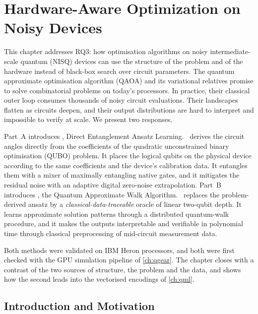 \chapter{Hardware-Aware Optimization on Noisy Devices}\label{ch:nisq}

This chapter addresses RQ3: how optimisation algorithms on noisy intermediate-scale quantum (NISQ) devices can use the structure of the problem and of the hardware instead of black-box search over circuit parameters. The quantum approximate optimisation algorithm (QAOA) and its variational relatives promise to solve combinatorial problems on today's processors. In practice, their classical outer loop consumes thousands of noisy circuit evaluations. Their landscapes flatten as circuits deepen, and their output distributions are hard to interpret and impossible to verify at scale. We present two responses.

Part~A introduces \deal, Direct Entanglement Ansatz Learning. \deal\ derives the circuit angles directly from the coefficients of the quadratic unconstrained binary optimisation (QUBO) problem. It places the logical qubits on the physical device according to the same coefficients and the device's calibration data. It entangles them with a mixer of maximally entangling native gates, and it mitigates the residual noise with an adaptive digital zero-noise extrapolation. Part~B introduces \qawa, the Quantum Approximate Walk Algorithm. \qawa\ replaces the problem-derived ansatz by a \emph{classical-data-traceable} oracle of linear two-qubit depth. It learns approximate solution patterns through a distributed quantum-walk procedure, and it makes the outputs interpretable and verifiable in polynomial time through classical preprocessing of mid-circuit measurement data.

Both methods were validated on IBM Heron processors, and both were first checked with the GPU simulation pipeline of \cref{ch:qgear}. The chapter closes with a contrast of the two sources of structure, the problem and the data, and shows how the second leads into the vectorised encodings of \cref{ch:qml}.

\section{Introduction and Motivation}\label{sec:nisq:intro}

